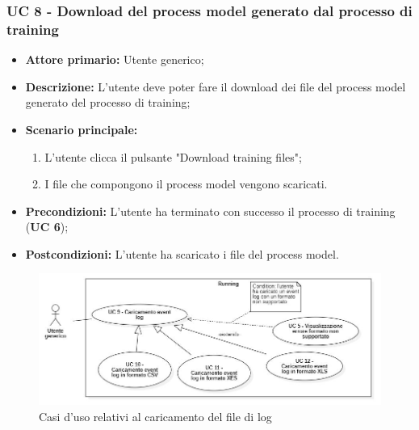 \subsubsection{UC 8 - Download del process model generato dal processo di training}
\begin{itemize}
	\item \textbf{Attore primario:} Utente generico;
	\item \textbf{Descrizione:} L'utente deve poter fare il download dei file del process model generato del processo di training;
	\item \textbf{Scenario principale:}
		\begin{enumerate}
			\item L'utente clicca il pulsante "Download training files";
			\item I file che compongono il process model vengono scaricati.
		\end{enumerate}
	\item \textbf{Precondizioni:} L'utente ha terminato con successo il processo di training (\textbf{UC 6}); 
	\item \textbf{Postcondizioni:} L'utente ha scaricato i file del process model.
\end{itemize}




\begin{figure}[H]
    \centering
    \includegraphics[scale=0.6]{immagini/usecase/cd6.JPG}
    \caption{Casi d'uso relativi al caricamento del file di log}
\end{figure}



